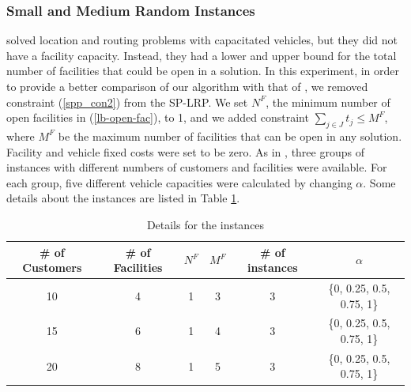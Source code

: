 \documentclass[graybox]{./styles/svmult}
\begin{document}
\subsubsection{Small and Medium Random Instances}
\citet{Laporte86} solved location and routing problems with capacitated
vehicles, but they did not have a facility capacity. Instead, they had
a lower and upper bound for the total number of facilities that could
be open in a solution. In this experiment, in order to provide a
better comparison of our algorithm with that of \citet{Laporte86}, we
removed constraint (\ref{spp_con2}) from the SP-LRP. We set $N^F$, the
minimum number of open facilities in (\ref{lb-open-fac}), to 1, and we
added constraint $\sum_{j \in J} t_{j} \leq M^F$, where $M^F$ be the
maximum number of facilities that can be open in any solution.
Facility and vehicle fixed costs were set to be zero. As in
\citet{Laporte86}, three groups of instances with different numbers of
customers and facilities were available. For each group, five
different vehicle capacities were calculated by changing $\alpha$.
Some details about the instances are listed in Table \ref{inst1}.
\begin {table}[ht]
\begin{center}
\caption {Details for the instances} \label{inst1}
\begin {tabular}[t]{|c|c|c|c|c|c|} \hline
\# of Customers & \# of Facilities & $N^F$ & $M^F$ & \# of instances & $\alpha$ \\ \hline
10 & 4 & 1 & 3 & 3 & \{0, 0.25, 0.5, 0.75, 1\} \\
15 & 6 & 1 & 4 & 3 & \{0, 0.25, 0.5, 0.75, 1\} \\
20 & 8 & 1 & 5 & 3 & \{0, 0.25, 0.5, 0.75, 1\} \\\hline
\end{tabular}
\end{center}
\end{table}
\end{document}
